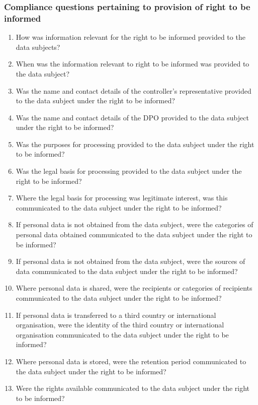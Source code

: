 \subsubsection{Compliance questions pertaining to provision of right to be informed}
\begin{enumerate}[label={\textit{CMQ.\theenumi}},resume]
    \item How was information relevant for the right to be informed provided to the data subjects?
    \item When was the information relevant to right to be informed was provided to the data subject?
    \item Was the name and contact details of the controller’s representative provided to the data subject under the right to be informed?
    \item Was the name and contact details of the DPO provided to the data subject under the right to be informed?
    \item Was the purposes for processing provided to the data subject under the right to be informed?
    \item Was the legal basis for processing provided to the data subject under the right to be informed?
    \item Where the legal basis for processing was legitimate interest, was this communicated to the data subject under the right to be informed?
    \item If personal data is not obtained from the data subject, were the categories of personal data obtained communicated to the data subject under the right to be informed?
    \item If personal data is not obtained from the data subject, were the sources of data communicated to the data subject under the right to be informed?
    \item Where personal data is shared, were the recipients or categories of recipients communicated to the data subject under the right to be informed?
    \item If personal data is transferred to a third country or international organisation, were the identity of the third country or international organisation communicated to the data subject under the right to be informed?
    \item Where personal data is stored, were the retention period communicated to the data subject under the right to be informed?
    \item Were the rights available communicated to the data subject under the right to be informed?

\end{enumerate}
